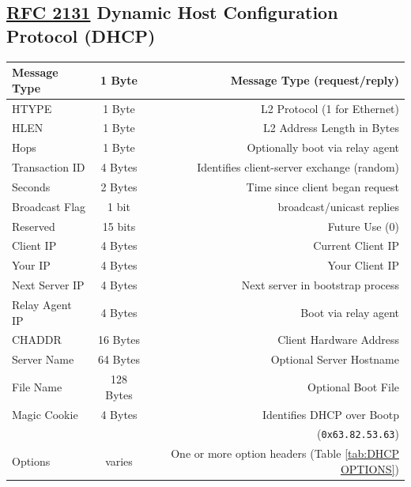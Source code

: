 \documentclass[12pt]{article}
\newcommand{\RFC}[1]{\href{https://datatracker.ietf.org/doc/html/rfc#1}{RFC #1}}
\begin{document}
	\subsection[RFC 2131 DHCP]{\RFC{2131} Dynamic Host Configuration Protocol (DHCP) \label{subsec:DHCP}}
	\begin{table}[H]
	\centering
	\begin{tabular}{| l | c | r |}
	\hline
	Message Type		& 1 Byte	& Message Type (request/reply)\\\hline
	HTYPE			& 1 Byte	& L2 Protocol (1 for Ethernet)\\\hline
	HLEN				& 1 Byte	& L2 Address Length in Bytes\\\hline
	Hops				& 1 Byte	& Optionally boot via relay agent\\\hline
	Transaction ID		& 4 Bytes	& Identifies client-server exchange (random)\\\hline
	Seconds			& 2 Bytes	& Time since client began request\\\hline
	Broadcast Flag		& 1 bit 	& broadcast/unicast replies\\\hline
	Reserved			& 15 bits	& Future Use (0)\\\hline
	Client IP			& 4 Bytes	& Current Client IP\\\hline
	Your IP			& 4 Bytes	& Your Client IP\\\hline
	Next Server IP		& 4 Bytes	& Next server in bootstrap process\\\hline
	Relay Agent IP		& 4 Bytes	& Boot via relay agent\\\hline
	CHADDR			& 16 Bytes	& Client Hardware Address\\\hline
	Server Name		& 64 Bytes	& Optional Server Hostname\\\hline
	File Name			& 128 Bytes	& Optional Boot File\\\hline
	Magic Cookie		& 4 Bytes	& Identifies DHCP over Bootp\\
					&		& (\texttt{0x63.82.53.63})\\\hline
	Options			& varies	& One or more option headers (Table \ref{tab:DHCP OPTIONS})\\\hline
	\end{tabular}\end{table}
\end{document}
